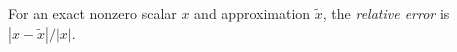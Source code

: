 
For an exact nonzero scalar $x$ and approximation $\widetilde x$, the \emph{relative error} is $|x-\widetilde x|/|x|$.
